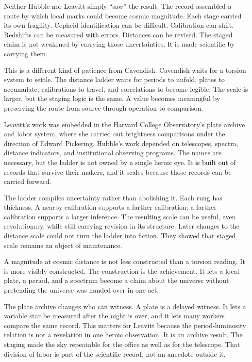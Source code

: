 Neither Hubble nor Leavitt simply ``saw'' the result. The record assembled
a route by which local marks could become cosmic magnitude. Each stage
carried its own fragility. Cepheid identification can be difficult.
Calibration can shift. Redshifts can be measured with errors. Distances can
be revised. The staged claim is not weakened by carrying those
uncertainties. It is made scientific by carrying them.

This is a different kind of patience from Cavendish. Cavendish waits for a
torsion system to settle. The distance ladder waits for periods to unfold,
plates to accumulate, calibrations to travel, and correlations to become
legible. The scale is larger, but the staging logic is the same. A value
becomes meaningful by preserving the route from source through operation to
comparison.

Leavitt's work was embedded in the Harvard College Observatory's plate
archive and labor system, where she carried out brightness comparisons
under the direction of Edward Pickering. Hubble's work depended on
telescopes, spectra, distance indicators, and institutional observing
programs. The names are necessary, but the ladder is not owned by a single
heroic eye. It is built out of records that survive their makers, and it
scales because those records can be carried forward.

The ladder compiles uncertainty rather than abolishing it. Each rung has
thickness. A nearby calibration supports a farther calibration; a farther
calibration supports a larger inference. The resulting scale can be useful,
even revolutionary, while still carrying revision in its structure. Later
changes to the distance scale could not turn the ladder into fiction. They
showed that staged scale remains an object of maintenance.

A magnitude at cosmic distance is not less constructed than a torsion
reading. It is more visibly constructed. The construction is the
achievement. It lets a local plate, a period, and a spectrum become a
claim about the universe without pretending the universe was handed over
in one act.

The plate archive changes who can witness. A plate is a delayed witness.
It lets a variable star be measured after the night is over, and it lets
many workers compare the same record. This matters for Leavitt because the
period-luminosity relation is not a revelation in one heroic observation.
It is an archive result. The staging made the sky repeatable for the
office as well as for the telescope. That division of labor is part of the
scientific record, not an anecdote outside it.

